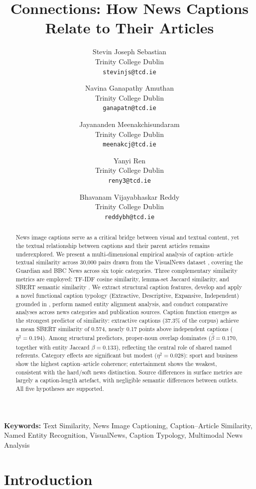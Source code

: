 \documentclass[11pt,a4paper]{article}
\title{\textbf{Connections: How News Captions Relate to Their Articles}}
\date{}
\author{
  Stevin Joseph Sebastian\\
  Trinity College Dublin\\
  \texttt{stevinjs@tcd.ie}
  \and
  Navina Ganapathy Amuthan\\
  Trinity College Dublin\\
  \texttt{ganapatn@tcd.ie}
  \and
  Jayananden Meenakchisundaram\\
  Trinity College Dublin\\
  \texttt{meenakcj@tcd.ie}
  \and
  Yanyi Ren\\
  Trinity College Dublin\\
  \texttt{reny3@tcd.ie}
  \and
  Bhavanam Vijayabhaskar Reddy\\
  Trinity College Dublin\\
  \texttt{reddybh@tcd.ie}
}
\begin{document}
\maketitle

\begin{abstract}

News image captions serve as a critical bridge between visual and textual
content, yet the textual relationship between captions and their parent
articles remains underexplored. We present a multi-dimensional empirical
analysis of caption--article textual similarity across 30,000 pairs drawn
from the VisualNews dataset \citep{liu2021visualnews}, covering the Guardian
and BBC News across six topic categories. Three complementary similarity
metrics are employed: TF-IDF cosine similarity, lemma-set Jaccard
similarity, and SBERT semantic similarity \citep{Reimers2019}. We extract
structural caption features, develop and apply a novel functional caption
typology (Extractive, Descriptive, Expansive, Independent) grounded in
\citet{marsh2003taxonomy}, perform named entity alignment analysis, and
conduct comparative analyses across news categories and publication sources.
Caption function emerges as the strongest predictor of similarity: extractive
captions (37.3\% of the corpus) achieve a mean SBERT similarity of 0.574,
nearly 0.17 points above independent captions ($\eta^2 = 0.194$). Among
structural predictors, proper-noun overlap dominates ($\hat{\beta} = 0.170$,
together with entity Jaccard $\hat{\beta} = 0.133$), reflecting the central
role of shared named referents. Category effects are significant but modest
($\eta^2 = 0.028$): sport and business show the highest caption--article
coherence; entertainment shows the weakest, consistent with the hard/soft
news distinction. Source differences in surface metrics are largely a
caption-length artefact, with negligible semantic differences between outlets.
All five hypotheses are supported.

\end{abstract}

\noindent\textbf{Keywords:} Text Similarity, News Image Captioning,
Caption--Article Similarity, Named Entity Recognition, VisualNews,
Caption Typology, Multimodal News Analysis

\section{Introduction}
\end{document}
